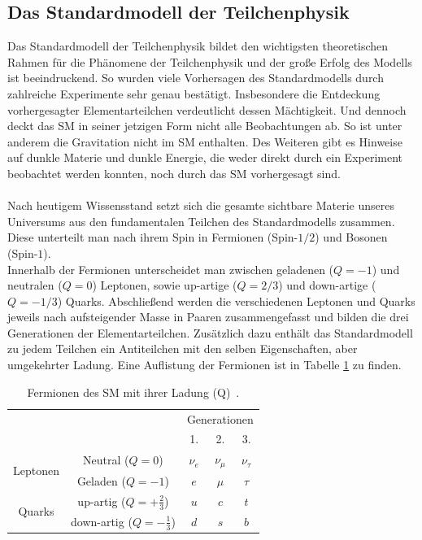 \subsection{Das Standardmodell der Teilchenphysik}
\label{kapsm}
Das Standardmodell der Teilchenphysik bildet den wichtigsten theoretischen Rahmen f\"ur die Ph\"anomene der Teilchenphysik und der gro\ss{}e Erfolg des Modells ist beeindruckend.
So wurden viele Vorhersagen des Standardmodells durch zahlreiche Experimente sehr genau best\"atigt. Insbesondere die Entdeckung vorhergesagter Elementarteilchen verdeutlicht dessen M\"achtigkeit.
Und dennoch deckt das SM in seiner jetzigen Form nicht alle Beobachtungen ab. So ist unter anderem die Gra\-vi\-ta\-tion nicht im SM enthalten. Des Weiteren gibt es Hinweise auf dunkle Materie und dunkle Energie, die weder direkt durch ein Experiment beobachtet werden konnten, noch durch das SM vorhergesagt sind.
\\
\\
Nach heutigem Wissensstand setzt sich die gesamte sichtbare Materie unseres Universums aus den fundamentalen Teilchen des Standardmodells zusammen.
Diese unterteilt man nach ihrem Spin in Fermionen (Spin-$1/2$) und Bosonen (Spin-$1$).\\
Innerhalb der Fermionen unterscheidet man zwischen geladenen ($Q = -1$) und neutralen ($Q = 0$) Leptonen, sowie up-artige ($Q = 2/3$) und down-artige ($Q = -1/3$) Quarks.
Abschlie\ss{}end werden die verschiedenen Leptonen und Quarks jeweils nach aufsteigender Masse in Paaren zusammengefasst und bilden die drei Generationen der Elementarteilchen. 
Zus\"atzlich dazu enth\"alt das Standardmodell zu jedem Teilchen ein Antiteilchen mit den selben Eigenschaften, aber umgekehrter Ladung.
Eine Auflistung der Fermionen ist in Tabelle \ref{Fermionen} zu finden.\\
\begin{table}[bp]
\centering
\begin{tabular}{c|c||ccc}
  \cline{3-5}
   \multicolumn{2}{c|}{\multirow{2}{*}{}} & \multicolumn{3}{c}{Generationen}\\
   \multicolumn{2}{c|}{} & 1. & 2. & 3. \\
  \hline
  \multirow{2}{*}{{Leptonen}} & Neutral ($Q=0$) & $\nu_{e}$ & $\nu_{\mu}$ & $\nu_{\tau}$ \\
   \cline{2-5}
   & Geladen ($Q=-1$) & $e$ & $\mu$ & $\tau$ \\
  \hline \hline
  \multirow{2}{*}{{Quarks}} & up-artig ($Q=+\frac{2}{3}$) & $u$ & $c$ & $t$ \\
  \cline{2-5}
   & down-artig ($Q=-\frac{1}{3}$) & $d$ & $s$ & $b$ \\
  \hline
\end{tabular}
	  	\caption{Fermionen des SM mit ihrer Ladung (Q)~\cite{pdg}. }
	  		\label{Fermionen}
\end{table}
